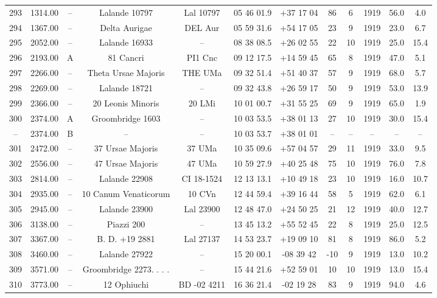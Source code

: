 \begin{table}
\begin{tabular}{cccccccccccc}
293 & 1314.00 & -- & Lalande 10797 & Lal 10797 & 05 46 01.9 & +37 17 04 & 86 & 6 & 1919 & 56.0 & 4.0 \\
294 & 1367.00 & -- & Delta Aurigae & DEL Aur & 05 59 31.6 & +54 17 05 & 23 & 9 & 1919 & 23.0 & 6.7 \\
295 & 2052.00 & -- & Lalande 16933 & -- & 08 38 08.5 & +26 02 55 & 22 & 10 & 1919 & 25.0 & 15.4 \\
296 & 2193.00 & A & 81 Cancri & PI1 Cnc & 09 12 17.5 & +14 59 45 & 65 & 8 & 1919 & 47.0 & 5.1 \\
297 & 2266.00 & -- & Theta Ursae Majoris & THE UMa & 09 32 51.4 & +51 40 37 & 57 & 9 & 1919 & 68.0 & 5.7 \\
298 & 2269.00 & -- & Lalande 18721 & -- & 09 32 43.8 & +26 59 17 & 50 & 9 & 1919 & 53.0 & 13.9 \\
299 & 2366.00 & -- & 20 Leonis Minoris & 20 LMi & 10 01 00.7 & +31 55 25 & 69 & 9 & 1919 & 65.0 & 1.9 \\
300 & 2374.00 & A & Groombridge 1603 & -- & 10 03 53.5 & +38 01 13 & 27 & 10 & 1919 & 30.0 & 15.4 \\
-- & 2374.00 & B & -- & -- & 10 03 53.7 & +38 01 01 & -- & -- & -- & -- & -- \\
301 & 2472.00 & -- & 37 Ursae Majoris & 37 UMa & 10 35 09.6 & +57 04 57 & 29 & 11 & 1919 & 33.0 & 9.5 \\
302 & 2556.00 & -- & 47 Ursae Majoris & 47 UMa & 10 59 27.9 & +40 25 48 & 75 & 10 & 1919 & 76.0 & 7.8 \\
303 & 2814.00 & -- & Lalande 22908 & CI 18-1524 & 12 13 13.1 & +10 49 18 & 23 & 10 & 1919 & 16.0 & 10.7 \\
304 & 2935.00 & -- & 10 Canum Venaticorum & 10 CVn & 12 44 59.4 & +39 16 44 & 58 & 5 & 1919 & 62.0 & 6.1 \\
305 & 2945.00 & -- & Lalande 23900 & Lal 23900 & 12 48 47.0 & +24 50 25 & 21 & 12 & 1919 & 40.0 & 12.7 \\
306 & 3138.00 & -- & Piazzi 200 & -- & 13 45 13.2 & +55 52 45 & 22 & 8 & 1919 & 25.0 & 12.5 \\
307 & 3367.00 & -- & B. D. +19  2881 & Lal 27137 & 14 53 23.7 & +19 09 10 & 81 & 8 & 1919 & 86.0 & 5.2 \\
308 & 3460.00 & -- & Lalande 27922 & -- & 15 20 00.1 & -08 39 42 & -10 & 9 & 1919 & 13.0 & 10.2 \\
309 & 3571.00 & -- & Groombridge 2273. . . . & -- & 15 44 21.6 & +52 59 01 & 10 & 10 & 1919 & 13.0 & 15.4 \\
310 & 3773.00 & -- & 12 Ophiuchi & BD -02 4211 & 16 36 21.4 & -02 19 28 & 83 & 9 & 1919 & 94.0 & 4.6 \\

\end{tabular}
\end{table}
